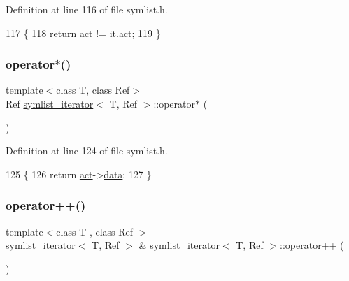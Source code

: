 Definition at line 116 of file symlist.\+h.


\begin{DoxyCode}
117     \{
118     \textcolor{keywordflow}{return} \mbox{\hyperlink{structsymlist__iterator_a1c7a0193ab85baa7705070975d841fc8}{act}} != it.act;
119     \}
\end{DoxyCode}
\mbox{\label{structsymlist__iterator_adcb398097fb58caeb6c55ef78744bccf}} 
\subsubsection{\texorpdfstring{operator$\ast$()}{operator*()}}
{\footnotesize\ttfamily template$<$class T, class Ref$>$ \\
Ref \mbox{\hyperlink{structsymlist__iterator}{symlist\+\_\+iterator}}$<$ T, Ref $>$\+::operator$\ast$ (\begin{DoxyParamCaption}{ }\end{DoxyParamCaption})\hspace{0.3cm}{\ttfamily [inline]}}



Definition at line 124 of file symlist.\+h.


\begin{DoxyCode}
125     \{
126     \textcolor{keywordflow}{return} \mbox{\hyperlink{structsymlist__iterator_a1c7a0193ab85baa7705070975d841fc8}{act}}->\mbox{\hyperlink{structsymnode_a079c4145d1af3d5ddab2cc9c7b3e0563}{data}};
127     \}
\end{DoxyCode}
\mbox{\label{structsymlist__iterator_a04939591b3f553d3e59b004d07cc8598}} 
\subsubsection{\texorpdfstring{operator++()}{operator++()}}
{\footnotesize\ttfamily template$<$class T , class Ref $>$ \\
\mbox{\hyperlink{structsymlist__iterator}{symlist\+\_\+iterator}}$<$ T, Ref $>$ \& \mbox{\hyperlink{structsymlist__iterator}{symlist\+\_\+iterator}}$<$ T, Ref $>$\+::operator++ (\begin{DoxyParamCaption}{ }\end{DoxyParamCaption})}



